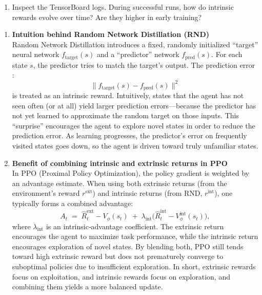\documentclass[12pt]{article}
\begin{document}
{{{\begin{itemize}[noitemsep]
\begin{enumerate}
    \item Inspect the TensorBoard logs. During successful runs, how do intrinsic rewards evolve over time? Are they higher in early training?\\
    \end{enumerate}

    \begin{enumerate}
  \item \textbf{Intuition behind Random Network Distillation (RND)}\\
    Random Network Distillation introduces a fixed, randomly initialized “target” neural network \(f_{\text{target}}(s)\) and a “predictor” network \(f_{\text{pred}}(s)\). For each state \(s\), the predictor tries to match the target’s output. The prediction error : 
    \[
      \bigl\lVert f_{\text{target}}(s) - f_{\text{pred}}(s) \bigr\rVert^{2}
    \]
    is treated as an intrinsic reward. Intuitively, states that the agent has not seen often (or at all) yield larger prediction errors—because the predictor has not yet learned to approximate the random target on those inputs. This “surprise” encourages the agent to explore novel states in order to reduce the prediction error. As learning progresses, the predictor’s error on frequently visited states goes down, so the agent is driven toward truly unfamiliar states.\\

  \item \textbf{Benefit of combining intrinsic and extrinsic returns in PPO}\\
    In PPO (Proximal Policy Optimization), the policy gradient is weighted by an advantage estimate. When using both extrinsic returns (from the environment’s reward \(r^{\text{ext}}\)) and intrinsic returns (from RND, \(r^{\text{int}}\)), one typically forms a combined advantage:
    \[
      A_{t} \;=\; \hat{R}_{t}^{\text{ext}} - V_{\phi}(s_{t}) \;+\; \lambda_{\text{int}} \bigl(\hat{R}_{t}^{\text{int}} - V_{\phi}^{\text{int}}(s_{t}) \bigr),
    \]
    where \(\lambda_{\text{int}}\) is an intrinsic‐advantage coefficient. The extrinsic return encourages the agent to maximize task performance, while the intrinsic return encourages exploration of novel states. By blending both, PPO still tends toward high extrinsic reward but does not prematurely converge to suboptimal policies due to insufficient exploration. In short, extrinsic rewards focus on exploitation, and intrinsic rewards focus on exploration, and combining them yields a more balanced update.\\


\end{enumerate}
\end{itemize}}}}
\end{document}
